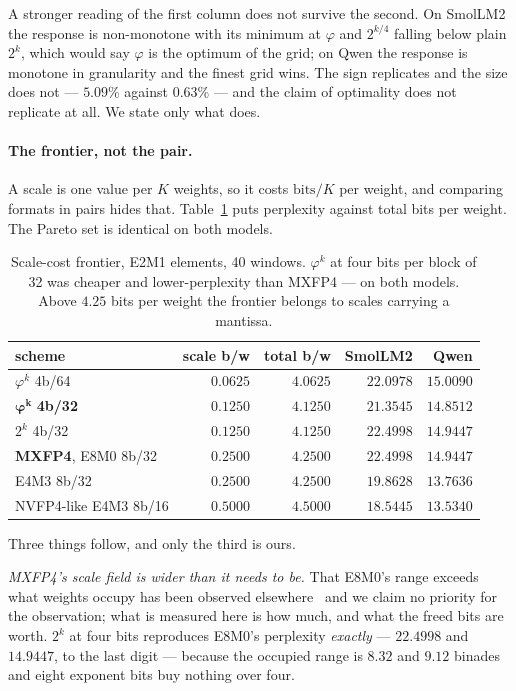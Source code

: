 \documentclass[11pt]{article}
\theoremstyle{definition}
\begin{document}
A stronger reading of the first column does not survive the second. On SmolLM2
the response is non-monotone with its minimum at $\varphi$ and $2^{k/4}$ falling
below plain $2^{k}$, which would say $\varphi$ is the optimum of the grid; on
Qwen the response is monotone in granularity and the finest grid wins. The sign
replicates and the size does not --- $5.09\%$ against $0.63\%$ --- and the claim
of optimality does not replicate at all. We state only what does.

\paragraph{The frontier, not the pair.} A scale is one value per $K$ weights,
so it costs $\mathrm{bits}/K$ per weight, and comparing formats in pairs hides
that. Table~\ref{tab:frontier} puts perplexity against total bits per weight.
The Pareto set is identical on both models.

\begin{table}[t]\centering
\caption{Scale-cost frontier, E2M1 elements, 40 windows. $\varphi^{k}$ at four
bits per block of 32 was cheaper and lower-perplexity than MXFP4 --- on both
models. Above $4.25$ bits per weight the frontier belongs to scales carrying a
mantissa.}
\label{tab:frontier}
\begin{tabular}{lrrrr}
\toprule
scheme & scale b/w & total b/w & SmolLM2 & Qwen \\
\midrule
$\varphi^{k}$ 4b/64        & $0.0625$ & $4.0625$ & $22.0978$ & $15.0090$ \\
$\boldsymbol{\varphi^{k}}$ \textbf{4b/32} & $\mathbf{0.1250}$ & $\mathbf{4.1250}$ & $\mathbf{21.3545}$ & $\mathbf{14.8512}$ \\
$2^{k}$ 4b/32              & $0.1250$ & $4.1250$ & $22.4998$ & $14.9447$ \\
\textbf{MXFP4}, E8M0 8b/32 & $0.2500$ & $4.2500$ & $22.4998$ & $14.9447$ \\
E4M3 8b/32                 & $0.2500$ & $4.2500$ & $19.8628$ & $13.7636$ \\
NVFP4-like E4M3 8b/16      & $0.5000$ & $4.5000$ & $18.5445$ & $13.5340$ \\
\bottomrule
\end{tabular}
\end{table}

Three things follow, and only the third is ours.

\emph{MXFP4's scale field is wider than it needs to be.} That E8M0's range
exceeds what weights occupy has been observed elsewhere~\cite{mxgap} and we
claim no priority for the observation; what is measured here is how much, and
what the freed bits are worth. $2^{k}$ at four bits reproduces E8M0's perplexity
\emph{exactly} --- $22.4998$ and
$14.9447$, to the last digit --- because the occupied range is $8.32$ and
$9.12$ binades and eight exponent bits buy nothing over four.
\end{document}
